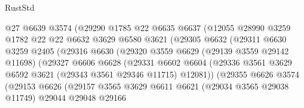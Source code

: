 \begin{lexlean}{RustStd}
\begin{coremodule}
                            @27
                            @6639
                            @3574
                            (@29290
                              @1785
                              @22
                              @6635
                              @6637
                              (@12055
                                @28990
                                @3259
                                @1782
                                @22
                                @22
                                @6632
                                @3629
                                @6580
                                @3621
                                (@29305
                                  @6632
                                  (@29311
                                    @6630
                                    @3259
                                    @2405
                                    (@29316
                                      @6630
                                      (@29320
                                        @3559
                                        @6629
                                        (@29139 @3559 @29142 @11698)
                                        (@29327
                                          @6606
                                          @6628
                                          (@29331
                                            @6602
                                            @6604
                                            (@29336
                                              @3561
                                              @3629
                                              @6592
                                              @3621
                                              (@29343 @3561 @29346 @11715)
                                              @12081))
                                          (@29355
                                            @6626
                                            @3574
                                            (@29153
                                              @6626
                                              (@29157
                                                @3565
                                                @3629
                                                @6611
                                                @6621
                                                (@29034 @3565 @29038 @11749)
                                                @29044
                                                @29048
                                                @29166

\end{coremodule}
\end{lexlean}
